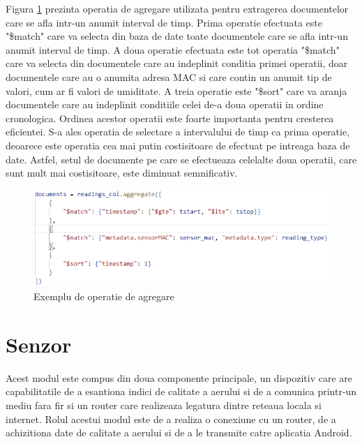 Figura \ref{fig:PI_AggregationExample} prezinta operatia de agregare utilizata pentru extragerea documentelor care se afla intr-un anumit interval de timp. Prima 
operatie efectuata este "\$match" care va selecta din baza de date toate documentele care se afla intr-un anumit interval de timp. A doua operatie efectuata este 
tot operatia "\$match" care va selecta din documentele care au indeplinit conditia primei operatii, doar documentele care au o anumita adresa MAC si care contin 
un anumit tip de valori, cum ar fi valori de umiditate. A treia operatie este "\$sort" care va aranja documentele care au indeplinit conditiile celei de-a doua 
operatii in ordine cronologica. Ordinea acestor operatii este foarte importanta pentru cresterea eficientei. S-a ales operatia de selectare a intervalului de timp 
ca prima operatie, deoarece este operatia cea mai putin costisitoare de efectuat pe intreaga baza de date. Astfel, setul de documente pe care se efectueaza celelalte 
doua operatii, care sunt mult mai costisitoare, este diminuat semnificativ.
\begin{figure}[H]
    \centering
    \includegraphics[scale=0.7]{figs/PI_AggregationExample.png}
    \caption{Exemplu de operatie de agregare}
    \label{fig:PI_AggregationExample}
\end{figure}

\section{Senzor}\label{sec:pi_senzor}
Acest modul este compus din doua componente principale, un dispozitiv care are capabilitatile de a esantiona indici de calitate a aerului si de a comunica 
printr-un mediu fara fir si un router care realizeaza legatura dintre reteaua locala si internet. Rolul acestui modul este de a realiza o conexiune cu un router,
de a achizitiona date de calitate a aerului si de a le transmite catre aplicatia Android. 

